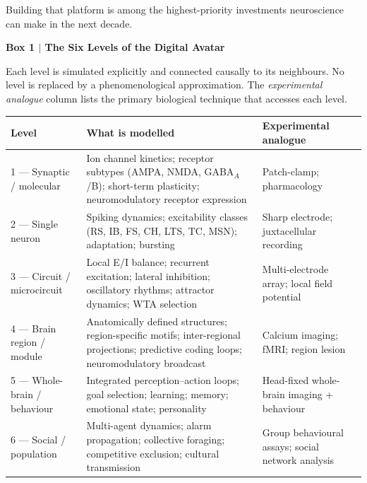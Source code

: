 \documentclass[12pt,a4paper]{article}
\begin{document}
Building that platform is among the highest-priority investments
neuroscience can make in the next decade.


\clearpage
\begin{mdframed}[style=naturebox]
\textbf{Box 1 $|$ The Six Levels of the Digital Avatar}

\medskip
\noindent Each level is simulated explicitly and connected causally to its
neighbours. No level is replaced by a phenomenological approximation.
The \textit{experimental analogue} column lists the primary biological
technique that accesses each level.

\medskip
\begin{tabularx}{\linewidth}{@{} l X X @{}}
\toprule
\textbf{Level} & \textbf{What is modelled} & \textbf{Experimental analogue} \\
\midrule
1 — Synaptic / molecular &
  Ion channel kinetics; receptor subtypes (AMPA, NMDA, GABA$_A$/B);
  short-term plasticity; neuromodulatory receptor expression &
  Patch-clamp; pharmacology \\[4pt]
2 — Single neuron &
  Spiking dynamics; excitability classes (RS, IB, FS, CH, LTS, TC,
  MSN); adaptation; bursting &
  Sharp electrode; juxtacellular recording \\[4pt]
3 — Circuit / microcircuit &
  Local E/I balance; recurrent excitation; lateral inhibition;
  oscillatory rhythms; attractor dynamics; WTA selection &
  Multi-electrode array; local field potential \\[4pt]
4 — Brain region / module &
  Anatomically defined structures; region-specific motifs;
  inter-regional projections; predictive coding loops;
  neuromodulatory broadcast &
  Calcium imaging; fMRI; region lesion \\[4pt]
5 — Whole-brain / behaviour &
  Integrated perception–action loops; goal selection; learning;
  memory; emotional state; personality &
  Head-fixed whole-brain imaging + behaviour \\[4pt]
6 — Social / population &
  Multi-agent dynamics; alarm propagation; collective foraging;
  competitive exclusion; cultural transmission &
  Group behavioural assays; social network analysis \\
\bottomrule
\end{tabularx}
\end{mdframed}
\end{document}

